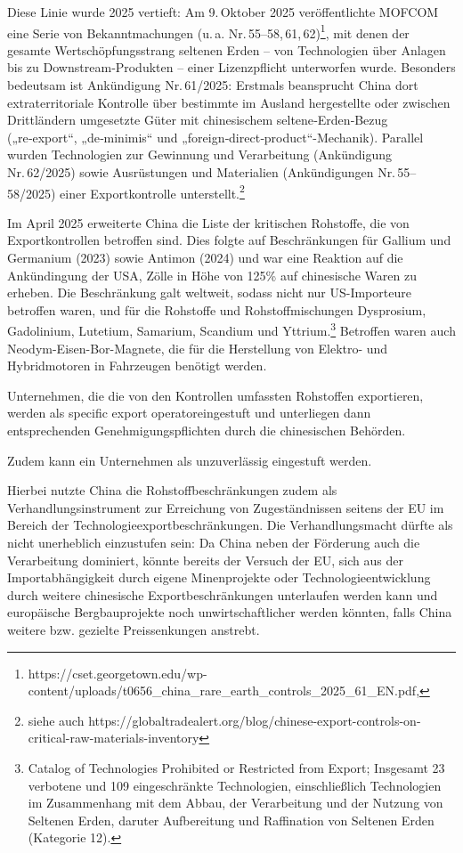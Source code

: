 \documentclass[12pt,a4paper,oneside]{book} %
\begin{document}
 Diese Linie wurde 2025 vertieft: Am 9. Oktober 2025 veröffentlichte MOFCOM eine Serie von Bekanntmachungen (u. a. Nr. 55–58, 61, 62)\footnote{https://cset.georgetown.edu/wp-content/uploads/t0656_china_rare_earth_controls_2025_61_EN.pdf, }, mit denen der gesamte Wertschöpfungsstrang seltenen Erden – von Technologien über Anlagen bis zu Downstream‑Produkten – einer Lizenzpflicht unterworfen wurde. Besonders bedeutsam ist Ankündigung Nr. 61/2025: Erstmals beansprucht China dort extraterritoriale Kontrolle über bestimmte im Ausland hergestellte oder zwischen Drittländern umgesetzte Güter mit chinesischem seltene‑Erden‑Bezug („re‑export“, „de‑minimis“ und „foreign‑direct‑product“-Mechanik).  Parallel wurden Technologien zur Gewinnung und Verarbeitung (Ankündigung Nr. 62/2025) sowie Ausrüstungen und Materialien (Ankündigungen Nr. 55–58/2025) einer Exportkontrolle unterstellt.\footnote{siehe auch https://globaltradealert.org/blog/chinese-export-controls-on-critical-raw-materials-inventory}

Im April 2025 erweiterte China die Liste der kritischen Rohstoffe, die von Exportkontrollen betroffen sind.\autocite{https://www.reuters.com/world/china/chinas-export-controls-are-curbing-critical-mineral-shipments-world-2025-04-20/} Dies folgte auf Beschränkungen für Gallium und Germanium (2023) sowie Antimon (2024) und war eine Reaktion auf die Ankündingung der USA, Zölle in Höhe von 125\% auf chinesische Waren zu erheben. Die Beschränkung galt weltweit, sodass nicht nur US-Importeure betroffen waren, und für die Rohstoffe und Rohstoffmischungen Dysprosium, Gadolinium, Lutetium, Samarium, Scandium und Yttrium.\footnote{Catalog of Technologies Prohibited or Restricted from Export; Insgesamt 23 verbotene und 109 eingeschränkte Technologien, einschließlich Technologien im Zusammenhang mit dem Abbau, der Verarbeitung und der Nutzung von Seltenen Erden, daruter Aufbereitung und Raffination von Seltenen Erden (Kategorie 12).} Betroffen waren auch Neodym-Eisen-Bor-Magnete, die für die Herstellung von Elektro- und Hybridmotoren in Fahrzeugen benötigt werden.

Unternehmen, die die von den Kontrollen umfassten Rohstoffen exportieren, werden als \glqq specific export operator\grqq eingestuft und unterliegen dann entsprechenden Genehmigungspflichten durch die chinesischen Behörden.

Zudem kann ein Unternehmen als unzuverlässig eingestuft werden.

Hierbei nutzte China die Rohstoffbeschränkungen zudem als Verhandlungsinstrument zur Erreichung von Zugeständnissen seitens der EU im Bereich der Technologieexportbeschränkungen.\autocite{Rohstoffe als Verhandlungswaffe, Handelsblatt} Die Verhandlungsmacht dürfte als nicht unerheblich einzustufen sein: Da China neben der Förderung auch die Verarbeitung dominiert, könnte bereits der Versuch der EU, sich aus der Importabhängigkeit durch eigene Minenprojekte oder Technologieentwicklung durch weitere chinesische Exportbeschränkungen unterlaufen werden kann und europäische Bergbauprojekte noch unwirtschaftlicher werden könnten, falls China weitere bzw. gezielte Preissenkungen anstrebt.\autocite{IW-Trends_2026-2-6_Neligan_et_al_Rohstoffe, S. 111}
\end{document}
